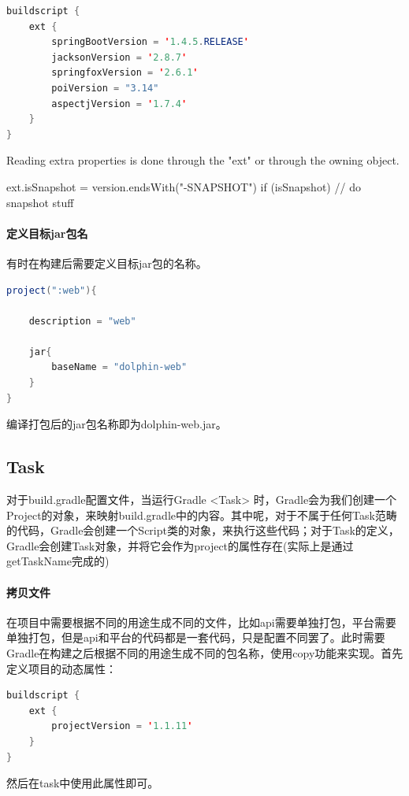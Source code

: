 \documentclass[letter]{book}
\begin{document}
\begin{lstlisting}[language=Java]
buildscript {
	ext {
		springBootVersion = '1.4.5.RELEASE'
		jacksonVersion = '2.8.7'
		springfoxVersion = '2.6.1'
		poiVersion = "3.14"
		aspectjVersion = '1.7.4'
	}
}
\end{lstlisting}

Reading extra properties is done through the "ext" or through the owning object.


ext.isSnapshot = version.endsWith("-SNAPSHOT")
if (isSnapshot) {
	// do snapshot stuff
}

\paragraph{定义目标jar包名}

有时在构建后需要定义目标jar包的名称。

\begin{lstlisting}[language=Java]
project(":web"){

	description = "web"
	
	jar{
		baseName = "dolphin-web"
	}
}
\end{lstlisting}

编译打包后的jar包名称即为dolphin-web.jar。

\subsection{Task}

对于build.gradle配置文件，当运行Gradle <Task> 时，Gradle会为我们创建一个Project的对象，来映射build.gradle中的内容。其中呢，对于不属于任何Task范畴的代码，Gradle会创建一个Script类的对象，来执行这些代码；对于Task的定义，Gradle会创建Task对象，并将它会作为project的属性存在(实际上是通过getTaskName完成的)

\paragraph{拷贝文件}

在项目中需要根据不同的用途生成不同的文件，比如api需要单独打包，平台需要单独打包，但是api和平台的代码都是一套代码，只是配置不同罢了。此时需要Gradle在构建之后根据不同的用途生成不同的包名称，使用copy功能来实现。首先定义项目的动态属性：

\begin{lstlisting}[language=Java]
buildscript {
	ext {
		projectVersion = '1.1.11'
	}
}
\end{lstlisting}

然后在task中使用此属性即可。
\end{document}
